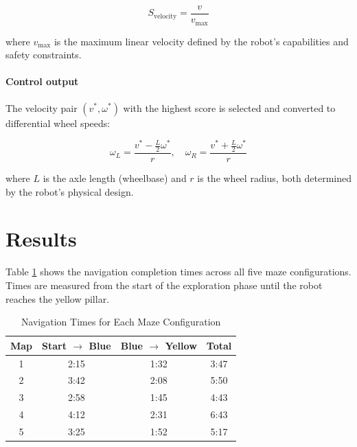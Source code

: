 \documentclass{article}
\begin{document}
$$
S_{\text{velocity}} = \frac{v}{v_{\text{max}}}
$$

\noindent where $v_{\text{max}}$ is the maximum linear velocity defined by the robot's capabilities and safety constraints.

\paragraph{Control output}

The velocity pair $(v^*, \omega^*)$ with the highest score is selected and converted to differential wheel speeds:

$$
\omega_L = \frac{v^* - \frac{L}{2} \omega^*}{r}, \quad \omega_R = \frac{v^* + \frac{L}{2} \omega^*}{r}
$$

\noindent where $L$ is the axle length (wheelbase) and $r$ is the wheel radius, both determined by the robot's physical design.

\newpage

\section{Results}


Table \ref{tab:navigation_times} shows the navigation completion times across all five maze configurations. Times are measured from the start of the exploration phase until the robot reaches the yellow pillar.

\begin{table}[H]
\centering
\caption{Navigation Times for Each Maze Configuration}
\label{tab:navigation_times}
\begin{tabular}{c|c|c|c}
\toprule
\textbf{Map} & \textbf{Start $\rightarrow$ Blue} & \textbf{Blue $\rightarrow$ Yellow} & \textbf{Total} \\
\midrule
1 & 2:15 & 1:32 & 3:47 \\
\midrule
2 & 3:42 & 2:08 & 5:50 \\
\midrule
3 & 2:58 & 1:45 & 4:43 \\
\midrule
4 & 4:12 & 2:31 & 6:43 \\
\midrule
5 & 3:25 & 1:52 & 5:17 \\
\bottomrule
\end{tabular}
\end{table}

\newpage
\end{document}
